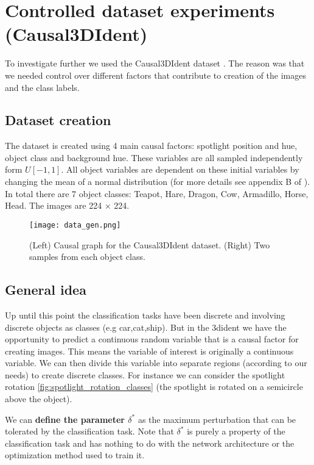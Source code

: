 \documentclass[../thesis.tex]{subfiles}
\begin{document}
\section{Controlled dataset experiments (Causal3DIdent)}


To investigate further we used the Causal3DIdent dataset \cite{isolates_Content_from_Style_2021}. The reason was that we needed control over different factors that contribute to creation of the images and the class labels.  


\subsection{Dataset creation}
The dataset is created using 4 main causal factors: spotlight position and hue, object class and background hue. These variables are all sampled independently form $U[-1,1]$. All object variables are dependent on these initial variables by changing the mean of a normal distribution (for more details see appendix B of \cite{isolates_Content_from_Style_2021}). In total there are 7 object classes: Teapot, Hare, Dragon, Cow, Armadillo, Horse, Head. The images are 224 × 224.

\begin{figure}[h!]
	\centering	
	\texttt{[image: data\_gen.png]}
	\caption{(Left) Causal graph for the Causal3DIdent dataset. (Right) Two samples from each object class.}
	\label{fig:sub1}
\end{figure}




\subsection{General idea}

Up until this point the classification tasks have been discrete and involving discrete objects as classes (e.g car,cat,ship). But in the 3dident we have the opportunity to predict a continuous random variable that is a causal factor for creating images. This means the variable of interest is originally a continuous variable. We can then divide this variable into separate regions (according to our needs) to create discrete classes. For instance we can consider the spotlight rotation \ref{fig:spotlight_rotation_classes} (the spotlight is rotated on a semicircle above the object). 

We can \textbf{define the parameter $\delta^*$} as the maximum perturbation that can be tolerated by the classification task. Note that $\delta^*$ is purely a property of the classification task and has nothing to do with the network architecture or the optimization method used to train it. 
\end{document}
